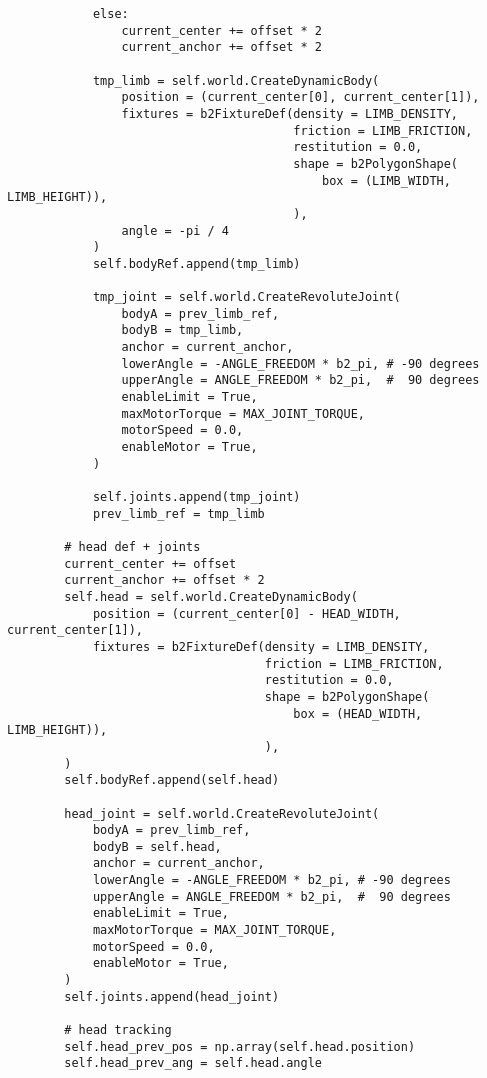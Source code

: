 \begin{lstlisting}
            else:
                current_center += offset * 2
                current_anchor += offset * 2

            tmp_limb = self.world.CreateDynamicBody(
                position = (current_center[0], current_center[1]),
                fixtures = b2FixtureDef(density = LIMB_DENSITY,
                                        friction = LIMB_FRICTION,
                                        restitution = 0.0,
                                        shape = b2PolygonShape(
                                            box = (LIMB_WIDTH, LIMB_HEIGHT)),
                                        ),
                angle = -pi / 4
            )
            self.bodyRef.append(tmp_limb)

            tmp_joint = self.world.CreateRevoluteJoint(
                bodyA = prev_limb_ref,
                bodyB = tmp_limb,
                anchor = current_anchor,
                lowerAngle = -ANGLE_FREEDOM * b2_pi, # -90 degrees
                upperAngle = ANGLE_FREEDOM * b2_pi,  #  90 degrees
                enableLimit = True,
                maxMotorTorque = MAX_JOINT_TORQUE,
                motorSpeed = 0.0,
                enableMotor = True,
            )

            self.joints.append(tmp_joint)
            prev_limb_ref = tmp_limb

        # head def + joints
        current_center += offset
        current_anchor += offset * 2
        self.head = self.world.CreateDynamicBody(
            position = (current_center[0] - HEAD_WIDTH, current_center[1]),
            fixtures = b2FixtureDef(density = LIMB_DENSITY,
                                    friction = LIMB_FRICTION,
                                    restitution = 0.0,
                                    shape = b2PolygonShape(
                                        box = (HEAD_WIDTH, LIMB_HEIGHT)),
                                    ),
        )
        self.bodyRef.append(self.head)

        head_joint = self.world.CreateRevoluteJoint(
            bodyA = prev_limb_ref,
            bodyB = self.head,
            anchor = current_anchor,
            lowerAngle = -ANGLE_FREEDOM * b2_pi, # -90 degrees
            upperAngle = ANGLE_FREEDOM * b2_pi,  #  90 degrees
            enableLimit = True,
            maxMotorTorque = MAX_JOINT_TORQUE,
            motorSpeed = 0.0,
            enableMotor = True,
        )
        self.joints.append(head_joint)

        # head tracking
        self.head_prev_pos = np.array(self.head.position)
        self.head_prev_ang = self.head.angle


\end{lstlisting}
